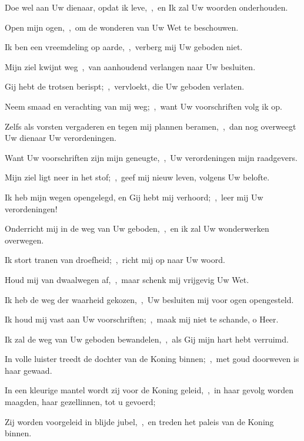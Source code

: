 \documentclass[12pt,twoside,a5paper]{article}
\begin{document}
\begin{halfparskip}
  Doe wel aan Uw dienaar, opdat ik leve,~\sep\ en Ik zal Uw woorden onderhouden.


  Open mijn ogen,~\sep\ om de wonderen van Uw Wet te beschouwen.

  Ik ben een vreemdeling op aarde,~\sep\ verberg mij Uw geboden niet.

  Mijn ziel kwijnt weg~\sep\ van aanhoudend verlangen naar Uw besluiten.

  Gij hebt de trotsen berispt;~\sep\ vervloekt, die Uw geboden verlaten.

  Neem smaad en verachting van mij weg;~\sep\ want Uw voorschriften volg ik op.

  Zelfs als vorsten vergaderen en tegen mij plannen beramen,~\sep\ dan nog overweegt Uw dienaar Uw verordeningen.

  Want Uw voorschriften zijn mijn geneugte,~\sep\ Uw verordeningen mijn raadgevers.

  Mijn ziel ligt neer in het stof;~\sep\ geef mij nieuw leven, volgens Uw belofte.

  Ik heb mijn wegen opengelegd, en Gij hebt mij verhoord;~\sep\ leer mij Uw verordeningen!

  Onderricht mij in de weg van Uw geboden,~\sep\ en ik zal Uw wonderwerken overwegen.

  Ik stort tranen van droefheid;~\sep\ richt mij op naar Uw woord.

  Houd mij van dwaalwegen af,~\sep\ maar schenk mij vrijgevig Uw Wet.

  Ik heb de weg der waarheid gekozen,~\sep\ Uw besluiten mij voor ogen opengesteld.

  Ik houd mij vast aan Uw voorschriften;~\sep\ maak mij niet te schande, o Heer.

  Ik zal de weg van Uw geboden bewandelen,~\sep\ als Gij mijn hart hebt verruimd.
\end{halfparskip}


\begin{halfparskip}
  In volle luister treedt de dochter van de Koning binnen;~\sep\ met goud doorweven is haar gewaad.


  In een kleurige mantel wordt zij voor de Koning geleid,~\sep\ in haar gevolg worden maagden, haar gezellinnen, tot u gevoerd;

  Zij worden voorgeleid in blijde jubel,~\sep\ en treden het paleis van de Koning binnen.
\end{halfparskip}
\end{document}
